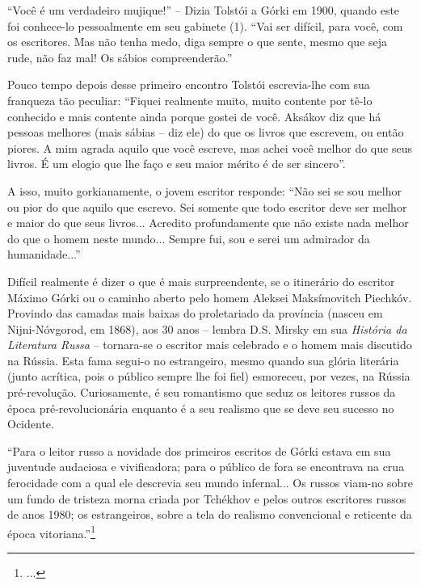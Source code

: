 ``Você é um verdadeiro mujique!'' -- Dizia Tolstói a Górki em 1900,
quando este foi conhece-lo pessoalmente em seu gabinete (1). ``Vai ser
difícil, para você, com os escritores. Mas não tenha medo, diga sempre o
que sente, mesmo que seja rude, não faz mal! Os sábios compreenderão.''

Pouco tempo depois desse primeiro encontro Tolstói escrevia-lhe com sua
franqueza tão peculiar: ``Fiquei realmente muito, muito contente por
tê-lo conhecido e mais contente ainda porque gostei de você. Aksákov diz
que há pessoas melhores (mais sábias -- diz ele) do que os livros que
escrevem, ou então piores. A mim agrada aquilo que você escreve, mas
achei você melhor do que seus livros. É um elogio que lhe faço e seu
maior mérito é de ser sincero''.

A isso, muito gorkianamente, o jovem escritor responde: ``Não sei se sou
melhor ou pior do que aquilo que escrevo. Sei somente que todo escritor
deve ser melhor e maior do que seus livros... Acredito profundamente que
não existe nada melhor do que o homem neste mundo... Sempre fui, sou e
serei um admirador da humanidade...''

Difícil realmente é dizer o que é mais surpreendente, se o itinerário do
escritor Máximo Górki ou o caminho aberto pelo homem Aleksei
Maksímovitch Piechkóv. Provindo das camadas mais baixas do proletariado
da província (nasceu em Nijni-Nóvgorod, em 1868), aos 30 anos -- lembra
D.S. Mirsky em sua \emph{História da Literatura Russa} -- tornara-se o
escritor mais celebrado e o homem mais discutido na Rússia. Esta fama
segui-o no estrangeiro, mesmo quando sua glória literária (junto
acrítica, pois o público sempre lhe foi fiel) esmoreceu, por vezes, na
Rússia pré-revolução. Curiosamente, é seu romantismo que seduz os
leitores russos da época pré-revolucionária enquanto é a seu realismo
que se deve seu sucesso no Ocidente.

``Para o leitor russo a novidade dos primeiros escritos de Górki estava
em sua juventude audaciosa e vivificadora; para o público de fora se
encontrava na crua ferocidade com a qual ele descrevia seu mundo
infernal... Os russos viam-no sobre um fundo de tristeza morna criada
por Tchékhov e pelos outros escritores russos de anos 1980; os
estrangeiros, sobre a tela do realismo convencional e reticente da época
vitoriana.''\footnote{...}

